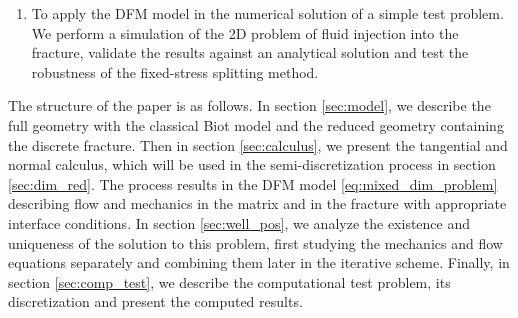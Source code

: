 \documentclass[a4paper]{article}
\numberwithin{equation}{section}
\def\js#1{{\color{blue}#1}}
\begin{document}
\begin{enumerate}
    \item To apply the DFM model in the numerical solution of a simple test problem.
We perform a simulation of the \js{2D} problem of fluid injection into the fracture, validate the results against an analytical solution and test the robustness of the fixed-stress splitting method.
\end{enumerate}

The structure of the paper is as follows.
In section \ref{sec:model}, we describe the full geometry with the classical Biot model and the reduced geometry containing the discrete fracture.
Then in section \ref{sec:calculus}, we present the tangential and normal calculus, which will be used in the semi-discretization process in section \ref{sec:dim_red}.
The process results in the DFM model \eqref{eq:mixed_dim_problem} describing  flow and mechanics in the matrix and in the fracture with appropriate interface conditions.
In section \ref{sec:well_pos}, we analyze the existence and uniqueness of the solution to this problem, first studying the mechanics and flow equations separately and combining them later in the iterative scheme.
Finally, in section \ref{sec:comp_test}, we describe the computational test problem, its discretization and present the computed results.
\end{document}
